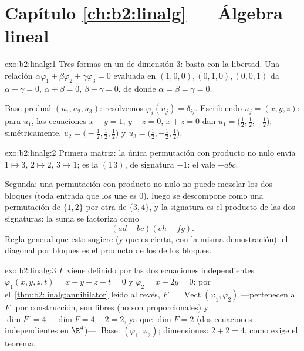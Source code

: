 \section*{Capítulo \ref{ch:b2:linalg} --- Álgebra lineal}

\begin{solution}{exo:b2:linalg:1}
Tres formas en un  de dimensión $3$: basta con la libertad. Una
relación $\alpha\varphi_1 + \beta\varphi_2 + \gamma\varphi_3 = 0$
evaluada en $(1,0,0), (0,1,0), (0,0,1)$ da $\alpha + \gamma = 0$,
$\alpha + \beta = 0$, $\beta + \gamma = 0$, de donde $\alpha = \beta =
\gamma = 0$.

Base predual $(u_1, u_2, u_3)$: resolvemos $\varphi_i(u_j) =
\delta_{ij}$. Escribiendo $u_j = (x, y, z)$: para $u_1$, las
ecuaciones $x + y = 1$, $y + z = 0$, $x + z = 0$ dan $u_1 =
\bigl(\tfrac12, \tfrac12, -\tfrac12\bigr)$; simétricamente, $u_2 =
\bigl(-\tfrac12, \tfrac12, \tfrac12\bigr)$ y $u_3 = \bigl(\tfrac12,
-\tfrac12, \tfrac12\bigr)$.
\end{solution}

\begin{solution}{exo:b2:linalg:2}
Primera matriz: la única permutación con producto no nulo envía $1
\mapsto 3$, $2 \mapsto 2$, $3 \mapsto 1$; es la 
$(1\,3)$, de signatura $-1$: el  vale $-abc$.

Segunda: una permutación con producto no nulo no puede mezclar los
dos bloques (toda entrada que los une es $0$), luego se descompone
como una permutación de $\{1,2\}$ por otra de $\{3,4\}$, y la
signatura es el producto de las dos signaturas: la suma se factoriza
como
\[
(ad - bc)(eh - fg) .
\]
Regla general que esto sugiere (y que es cierta, con la misma
demostración): el  diagonal por bloques es
el producto de los  de los bloques.
\end{solution}

\begin{solution}{exo:b2:linalg:3}
$F$ viene definido por las dos ecuaciones independientes
$\varphi_1(x,y,z,t) = x + y - z - t = 0$ y $\varphi_2 = x - 2y = 0$:
por el~\cref{thm:b2:linalg:annihilator} leído al revés, $F^\circ =
\operatorname{Vect}(\varphi_1, \varphi_2)$ ---pertenecen a $F^\circ$
por construcción, son libres (no son proporcionales) y $\dim F^\circ
= 4 - \dim F = 4 - 2 = 2$, ya que $\dim F = 2$ (dos ecuaciones
independientes en $\R^4$)---. Base: $(\varphi_1, \varphi_2)$;
dimensiones: $2 + 2 = 4$, como exige el teorema.
\end{solution}

